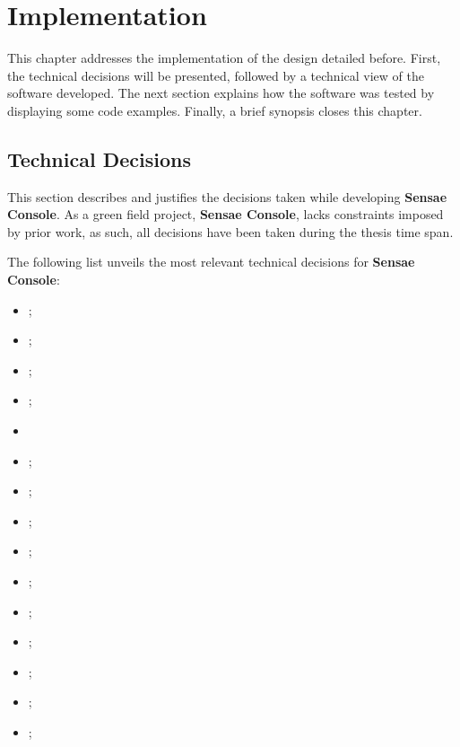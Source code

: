 \chapter{Implementation}
\label{chap:implementation}

This chapter addresses the implementation of the design detailed before. First, the technical decisions will be presented, followed by a technical view of the software developed. The next section explains how the software was tested by displaying some code examples. Finally, a brief synopsis closes this chapter.

\section{Technical Decisions}
\label{sec:implementation:decisions}

This section describes and justifies the decisions taken while developing \textbf{Sensae Console}.
As a green field project, \textbf{Sensae Console}, lacks constraints imposed by prior work, as such, all decisions have been taken during the thesis time span.

The following list unveils the most relevant technical decisions for \textbf{Sensae Console}:

\begin{itemize}
    \item {};
    \item {};
    \item {};
    \item {};
    \item {}
    \item {};
    \item {};
    \item {};
    \item {};
    \item {};
    \item {};
    \item {};
    \item {};
    \item {};
    \item {};
\end{itemize}

